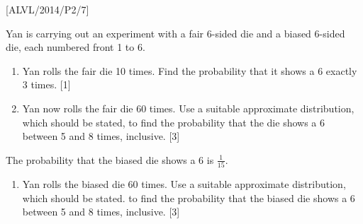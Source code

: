 \item {[}ALVL/2014/P2/7{]}

Yan is carrying out an experiment with a fair 6-sided die and a biased
6-sided die, each numbered front 1 to 6.
\begin{enumerate}
\item Yan rolls the fair die 10 times. Find the probability that it shows
a 6 exactly 3 times. \hfill{}{[}1{]}
\item Yan now rolls the fair die 60 times. Use a suitable approximate distribution,
which should be stated, to find the probability that the die shows
a 6 between 5 and 8 times, inclusive. \hfill{}{[}3{]}
\end{enumerate}
The probability that the biased die shows a 6 is $\frac{1}{15}$. 
\begin{enumerate}
\item Yan rolls the biased die 60 times. Use a suitable approximate distribution,
which should be stated. to find the probability that the biased die
shows a 6 between 5 and 8 times, inclusive. \hfill{}{[}3{]}
\end{enumerate}
